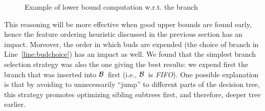 \documentclass{llncs}
\def\posclass{+}
\def\negclass{-}
\newcommand{\bud}[0]{\ensuremath{{\cal B}}}
\newcommand{\afeat}[0]{\ensuremath{f}}
\newcommand{\abranch}[0]{\ensuremath{b}}
\begin{document}
\begin{example}
\begin{figure}
\begin{center}
	\end{center}
	\caption{\label{fig:lowerbound} Example of lower bound computation w.r.t. the branch }
	\end{figure}

\end{example}


\medskip

This reasoning will be more effective when good upper bounds are found early, hence the feature ordering heuristic discussed in the previous section has an impact. Moreover, the order in which buds are expended (the choice of branch in Line~\ref{line:budchoice}) has an impact as well. We found that the simplest branch selection strategy was also the one giving the best results: we expend first the branch that was inserted into \bud\ first (i.e., \bud\ is \emph{FIFO}). One possible explanation is that by avoiding to unnecessarily ``jump'' to different parts of the decision tree, this strategy promotes optimizing sibling subtrees first, and therefore, deeper tree earlier.




\end{document}
